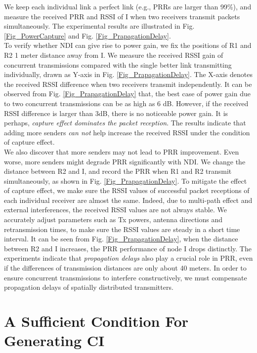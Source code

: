 \documentclass[conference]{IEEEtran}
\begin{document}
We keep each individual link a perfect link (e.g., PRRs are larger than 99\%), and measure the received PRR and RSSI of I when two receivers transmit packets simultaneously.
The experimental results are illustrated in Fig. \ref{Fig_PowerCapture} and Fig. \ref{Fig_PrapagationDelay}.\\
\indent To verify whether NDI can give rise to power gain, we fix the positions of R1 and R2 1 meter distance away from I. We measure the received RSSI gain of concurrent transmissions compared with the single better link transmitting individually, drawn as Y-axis in Fig. \ref{Fig_PrapagationDelay}.
The X-axis denotes the received RSSI difference when two receivers transmit independently.
It can be observed from Fig. \ref{Fig_PrapagationDelay} that, the best case of power gain due to two concurrent transmissions can be as high as 6 dB.
However, if the received RSSI difference is larger than 3dB, there is no noticeable power gain.
It is perhaps, \emph{capture effect dominates the packet reception}.
The results indicate that adding more senders \emph{can not} help increase the received RSSI under the condition of capture effect. \\
\indent We also discover that more senders may not lead to PRR improvement. Even worse, more senders might degrade PRR significantly with NDI. We change the distance between R2 and I, and record the PRR when R1 and R2 transmit simultaneously, as shown in Fig. \ref{Fig_PrapagationDelay}. To mitigate the effect of capture effect, we make sure the RSSI values of successful packet receptions of each individual receiver are almost the same. Indeed, due to multi-path effect and external interferences, the received RSSI values are not always stable. We accurately adjust parameters such as Tx powers, antenna directions and retransmission times, to make sure the RSSI values are steady in a short time interval. It can be seen from Fig. \ref{Fig_PrapagationDelay}, when the distance between R2 and I increases, the PRR performance of node I drops distinctly.
The experiments indicate that \emph{propagation delays} also play a crucial role in PRR, even if the differences of transmission distances are only about 40 meters.
In order to ensure concurrent transmissions to interfere constructively, we must compensate propagation delays of spatially distributed transmitters.\section{A Sufficient Condition For Generating CI}
\label{Sec_SC}
\end{document}
